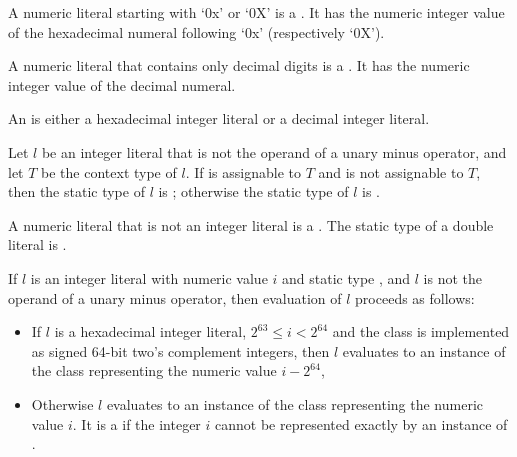 \documentclass[makeidx]{article}
\begin{document}
{\LMHash{}%
A numeric literal starting with `0x' or `0X'
is a .
It has the numeric integer value of the hexadecimal numeral
following `0x' (respectively `0X').

\LMHash{}%
A numeric literal that contains only decimal digits is a
.
It has the numeric integer value of the decimal numeral.

\LMHash{}%
An 
is either a hexadecimal integer literal or a decimal integer literal.

\LMHash{}%
Let $l$ be an integer literal that is not the operand
of a unary minus operator,
and let $T$ be the context type of $l$.
If  is assignable to $T$ and  is not assignable to $T$,
then the static type of $l$ is ;
otherwise the static type of $l$ is .


\LMHash{}%
A numeric literal that is not an integer literal is a
.
The static type of a double literal is .

\LMHash{}%
If $l$ is an integer literal with numeric value $i$ and static type ,
and $l$ is not the operand of a unary minus operator,
then evaluation of $l$ proceeds as follows:
\begin{itemize}
\item
  If $l$ is a hexadecimal integer literal,
  $2^{63} \le i < 2^{64}$ and the  class is implemented as
  signed 64-bit two's complement integers,
  then $l$ evaluates to an instance of the  class
  representing the numeric value $i - 2^{64}$,
\item
  Otherwise $l$ evaluates to an instance of the  class
  representing the numeric value $i$.
  It is a  if the integer $i$ cannot be represented
  exactly by an instance of .
\end{itemize}

}
\end{document}
